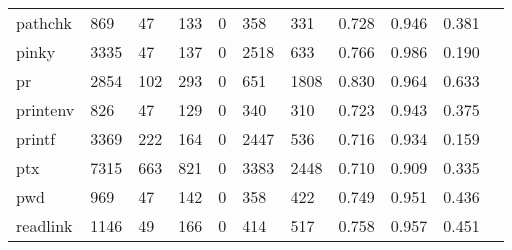 \begin{longtable}{lp{1.10cm}p{1.10cm}p{1.10cm}p{1.10cm}p{1.10cm}p{1.10cm}p{1.10cm}p{1.10cm}p{1.10cm}p{1.10cm}}
pathchk   &                    869 &                                 47 &                               133 &                                0 &                               358 &                             331 &                             0.728 &                                 0.946 &                               0.381 \\
pinky     &                   3335 &                                 47 &                               137 &                                0 &                              2518 &                             633 &                             0.766 &                                 0.986 &                               0.190 \\
pr        &                   2854 &                                102 &                               293 &                                0 &                               651 &                            1808 &                             0.830 &                                 0.964 &                               0.633 \\
printenv  &                    826 &                                 47 &                               129 &                                0 &                               340 &                             310 &                             0.723 &                                 0.943 &                               0.375 \\
printf    &                   3369 &                                222 &                               164 &                                0 &                              2447 &                             536 &                             0.716 &                                 0.934 &                               0.159 \\
ptx       &                   7315 &                                663 &                               821 &                                0 &                              3383 &                            2448 &                             0.710 &                                 0.909 &                               0.335 \\
pwd       &                    969 &                                 47 &                               142 &                                0 &                               358 &                             422 &                             0.749 &                                 0.951 &                               0.436 \\
readlink  &                   1146 &                                 49 &                               166 &                                0 &                               414 &                             517 &                             0.758 &                                 0.957 &                               0.451 \\

\end{longtable}
